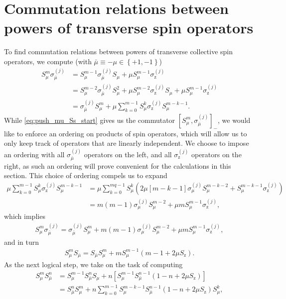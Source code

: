 \documentclass[aps,notitlepage,nofootinbib,11pt]{revtex4-1}
\newcommand{\p}[1]{\left(#1\right)} %
\renewcommand{\sp}[1]{\left[#1\right]} %
\renewcommand{\set}[1]{\left\{#1\right\}} %
\newcommand{\z}{\text{z}}
\newcommand{\bmu}{{\bar\mu}}
\newcommand{\1}{\mathds{1}}
\begin{document}
\section{Commutation relations between powers of transverse spin
  operators}
\label{sec:comm_transverse}

To find commutation relations between powers of transverse collective
spin operators, we compute (with $\bmu\equiv-\mu\in\set{+1,-1}$)
\begin{align}
  S_\mu^m \sigma_\bmu^{(j)}
  &= S_\mu^{m-1}\sigma_\bmu^{(j)} S_\mu
  + \mu S_\mu^{m-1} \sigma_\z^{(j)} \\
  &= S_\mu^{m-2} \sigma_\bmu^{(j)} S_\mu^2
  + \mu S_\mu^{m-2} \sigma_\z^{(j)} S_\mu
  + \mu S_\mu^{m-1} \sigma_\z^{(j)} \\
  &= \sigma_\bmu^{(j)} S_\mu^m
  + \mu \sum_{k=0}^{m-1} S_\mu^k \sigma_\z^{(j)} S_\mu^{m-k-1}
  \label{eq:push_mu_Ss_start}.
\end{align}
While \eqref{eq:push_mu_Ss_start} gives us the commutator
$\sp{S_\mu^m,\sigma_\bmu^{(j)}}_-$, we would like to enforce an
ordering on products of spin operators, which will allow us to only
keep track of operators that are linearly independent.  We choose to
impose an ordering with all $\sigma_\bmu^{(j)}$ operators on the left,
and all $\sigma_\z^{(j)}$ operators on the right, as such an ordering
will prove convenient for the calculations in this section.  This
choice of ordering compels us to expand
\begin{align}
  \mu \sum_{k=0}^{m-1} S_\mu^k \sigma_\z^{(j)} S_\mu^{m-k-1}
  &= \mu \sum_{k=0}^{mq-1} S_\mu^k
  \p{2\mu\sp{m-k-1} \sigma_\mu^{(j)} S_\mu^{m-k-2}
    + S_\mu^{m-k-1} \sigma_\z^{(j)}} \\
  &= m \p{m-1} \sigma_\mu^{(j)} S_\mu^{m-2}
  + \mu m S_\mu^{m-1} \sigma_\z^{(j)},
\end{align}
which implies
\begin{align}
  S_\mu^m \sigma_\bmu^{(j)}
  = \sigma_\bmu^{(j)} S_\mu^m + m \p{m-1} \sigma_\mu^{(j)} S_\mu^{m-2}
  + \mu m S_\mu^{m-1} \sigma_\z^{(j)},
  \label{eq:push_mu_Ss}
\end{align}
and in turn
\begin{align}
  S_\mu^m S_\bmu = S_\bmu S_\mu^m
  + m S_\mu^{m-1} \p{m - 1 + 2\mu S_\z}.
  \label{eq:push_mu_single}
\end{align}
As the next logical step, we take on the task of computing
\begin{align}
  S_\mu^m S_\bmu^n
  &= S_\mu^{m-1} S_\bmu^n S_\mu
  + n \sp{S_\mu^{m-1} S_\bmu^{n-1} \p{1 - n + 2\mu S_\z}} \\
  &= S_\bmu^n S_\mu^m
  + n \sum_{k=0}^{m-1} S_\mu^{m-k-1} S_\bmu^{n-1}
  \p{1 - n + 2\mu S_\z} S_\mu^k,
\end{align}
\end{document}
